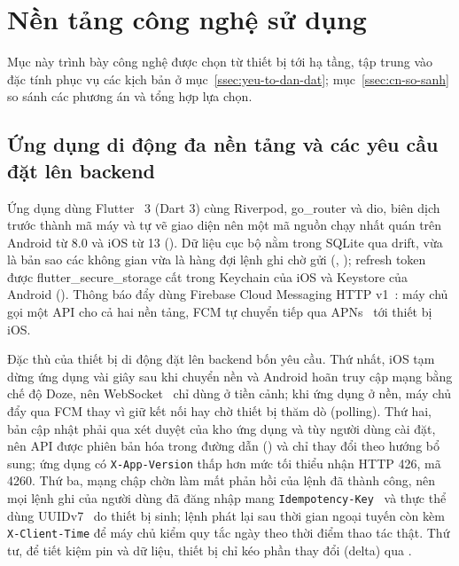\section{Nền tảng công nghệ sử dụng}\label{sec:cong-nghe}

Mục này trình bày công nghệ được chọn từ thiết bị tới hạ tầng, tập trung vào đặc tính phục vụ các kịch bản ở mục~\ref{ssec:yeu-to-dan-dat}; mục~\ref{ssec:cn-so-sanh} so sánh các phương án và tổng hợp lựa chọn.

\subsection{Ứng dụng di động đa nền tảng và các yêu cầu đặt lên backend}\label{ssec:cn-di-dong}

Ứng dụng dùng Flutter~\cite{flutter} 3 (Dart 3) cùng Riverpod, go\_router và dio, biên dịch trước thành mã máy và tự vẽ giao diện nên một mã nguồn chạy nhất quán trên Android từ 8.0 và iOS từ 13 (). Dữ liệu cục bộ nằm trong SQLite qua drift, vừa là bản sao các không gian vừa là hàng đợi lệnh ghi chờ gửi (, ); refresh token được flutter\_secure\_storage cất trong Keychain của iOS và Keystore của Android (). Thông báo đẩy dùng Firebase Cloud Messaging HTTP v1~\cite{fcm}: máy chủ gọi một API cho cả hai nền tảng, FCM tự chuyển tiếp qua APNs~\cite{apns} tới thiết bị iOS.

Đặc thù của thiết bị di động đặt lên backend bốn yêu cầu. Thứ nhất, iOS tạm dừng ứng dụng vài giây sau khi chuyển nền và Android hoãn truy cập mạng bằng chế độ Doze, nên WebSocket~\cite{rfc6455} chỉ dùng ở tiền cảnh; khi ứng dụng ở nền, máy chủ đẩy qua FCM thay vì giữ kết nối hay chờ thiết bị thăm dò (polling). Thứ hai, bản cập nhật phải qua xét duyệt của kho ứng dụng và tùy người dùng cài đặt, nên API được phiên bản hóa trong đường dẫn () và chỉ thay đổi theo hướng bổ sung; ứng dụng có \texttt{X-App-Version} thấp hơn mức tối thiểu nhận HTTP 426, mã 4260. Thứ ba, mạng chập chờn làm mất phản hồi của lệnh đã thành công, nên mọi lệnh ghi của người dùng đã đăng nhập mang \texttt{Idempotency-Key}~\cite{idempotencykey} và thực thể dùng UUIDv7~\cite{rfc9562} do thiết bị sinh; lệnh phát lại sau thời gian ngoại tuyến còn kèm \texttt{X-Client-Time} để máy chủ kiểm quy tắc ngày theo thời điểm thao tác thật. Thứ tư, để tiết kiệm pin và dữ liệu, thiết bị chỉ kéo phần thay đổi (delta) qua .

